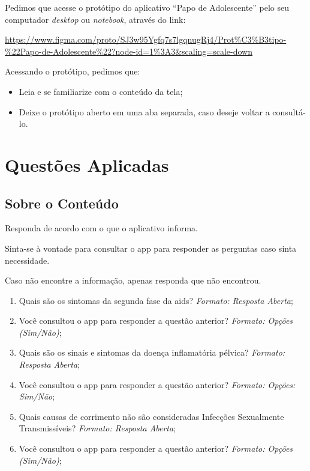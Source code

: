 \documentclass[12pt]{article}
\begin{document}
Pedimos que acesse o protótipo do aplicativo ``Papo de Adolescente'' pelo seu computador \textit{desktop} ou \textit{notebook}, através do link:

\url{https://www.figma.com/proto/SJ3w95Ygfq7s7lgqnugRj4/Prot%C3%B3tipo-%22Papo-de-Adolescente%22?node-id=1%3A3&scaling=scale-down}

Acessando o protótipo, pedimos que:

\begin{itemize}
	\item Leia e se familiarize com o conteúdo da tela;
	\item Deixe o protótipo aberto em uma aba separada, caso deseje voltar a consultá-lo.
\end{itemize}

\section{Questões Aplicadas}
\label{ap:questoes}

\subsection{Sobre o Conteúdo}

Responda de acordo com o que o aplicativo informa. 

Sinta-se à vontade para consultar o app para responder as perguntas caso sinta necessidade. 

Caso não encontre a informação, apenas responda que não encontrou.

\begin{enumerate}
	\item Quais são os sintomas da segunda fase da aids? \textit{Formato: Resposta Aberta};
	\item Você consultou o app para responder a questão anterior? \textit{Formato: Opções (Sim/Não)};
	\item Quais são os sinais e sintomas da doença inflamatória pélvica? \textit{Formato: Resposta Aberta};
	\item Você consultou o app para responder a questão anterior? \textit{Formato: Opções: Sim/Não};
	\item Quais causas de corrimento não são consideradas Infecções Sexualmente Transmissíveis? \textit{Formato: Resposta Aberta};
	\item Você consultou o app para responder a questão anterior? \textit{Formato: Opções (Sim/Não)};
\end{enumerate}
\end{document}
